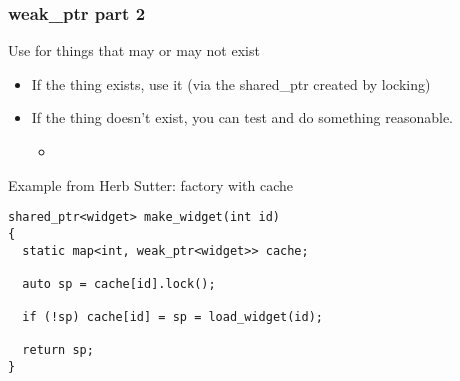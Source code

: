 \begin{frame}[fragile]
\frametitle{weak\_ptr part 2}
Use for things that may or may not exist
\begin{itemize}
\item If the thing exists, use it (via the shared\_ptr created by locking)
\item If the thing doesn't exist, you can test and do something reasonable.
  \begin{itemize}
  \item {}
  \end{itemize}
\end{itemize}
\pause{}
\vskip 12pt
Example from Herb Sutter: factory with cache
{\scriptsize\begin{verbatim}
shared_ptr<widget> make_widget(int id) 
{
  static map<int, weak_ptr<widget>> cache;

  auto sp = cache[id].lock();

  if (!sp) cache[id] = sp = load_widget(id);

  return sp;
}
\end{verbatim}
}

\vskip 12pt
\pause{}


\end{frame}

